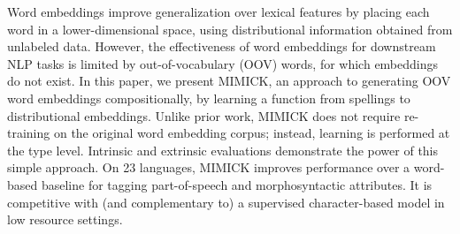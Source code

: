 Word embeddings improve generalization over lexical features by placing each word in a lower-dimensional space, using distributional information obtained from unlabeled data. However, the effectiveness of word embeddings for downstream NLP tasks is limited by out-of-vocabulary (OOV) words, for which embeddings do not exist. In this paper, we present MIMICK, an approach to generating OOV word embeddings compositionally, by learning a function from spellings to distributional embeddings. Unlike prior work, MIMICK does not require re-training on the original word embedding corpus; instead, learning is performed at the type level. Intrinsic and extrinsic evaluations demonstrate the power of this simple approach. On 23 languages, MIMICK improves performance over a word-based baseline for tagging part-of-speech and morphosyntactic attributes. It is competitive with (and complementary to) a supervised character-based model in low resource settings.
